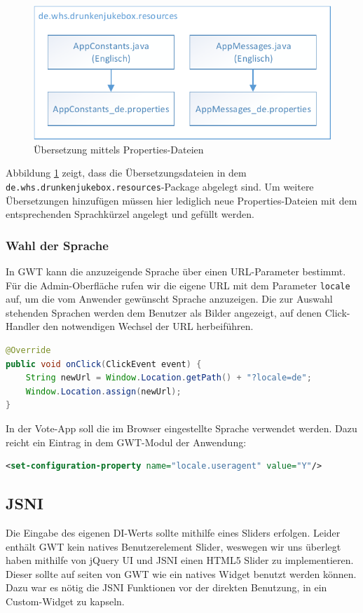 \begin{figure}[tbh]
\centering
\includegraphics[width=0.7\linewidth]{Bilder/Lokalisierung}
\caption{Übersetzung mittels Properties-Dateien}
\label{fig:Lokalisierung}
\end{figure}

Abbildung \ref{fig:Lokalisierung} zeigt, dass die Übersetzungsdateien in dem
\texttt{de.whs.drunkenjukebox.resources}-Package abgelegt sind. Um weitere
Übersetzungen hinzufügen müssen hier lediglich neue Properties-Dateien mit
dem entsprechenden Sprachkürzel angelegt und gefüllt werden.


\subsubsection{Wahl der Sprache}
In GWT kann die anzuzeigende Sprache über einen URL-Parameter bestimmt. Für die Admin-Oberfläche rufen wir die eigene URL
mit dem Parameter \texttt{locale} auf, um die vom Anwender
gewünscht Sprache anzuzeigen. Die zur Auswahl stehenden Sprachen werden dem Benutzer als Bilder angezeigt, auf denen Click-Handler den notwendigen Wechsel der URL herbeiführen.
\begin{lstlisting}[language=Java]
@Override
public void onClick(ClickEvent event) {
	String newUrl = Window.Location.getPath() + "?locale=de";
	Window.Location.assign(newUrl);
}
\end{lstlisting}
In der Vote-App soll die im Browser eingestellte Sprache verwendet werden. Dazu reicht ein Eintrag in dem GWT-Modul
der Anwendung:
\begin{lstlisting}[language=XML]
<set-configuration-property name="locale.useragent" value="Y"/>
\end{lstlisting}

\subsection{JSNI}
Die Eingabe des eigenen DI-Werts sollte mithilfe eines Sliders erfolgen. Leider enthält GWT kein natives Benutzerelement Slider, weswegen wir uns überlegt haben mithilfe von jQuery UI und JSNI einen HTML5 Slider zu implementieren. Dieser sollte auf seiten von GWT wie ein natives Widget benutzt werden können. Dazu war es nötig die JSNI Funktionen vor der direkten Benutzung, in ein Custom-Widget zu kapseln. 


